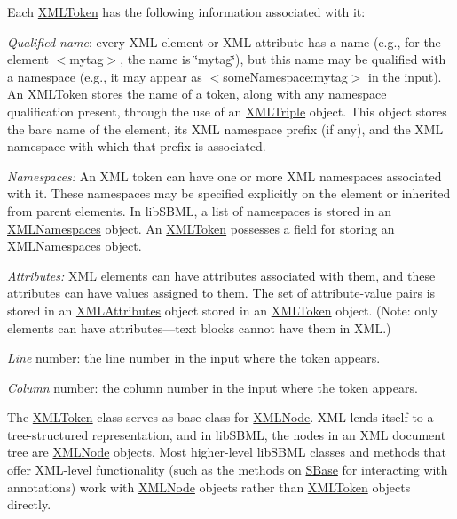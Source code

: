 Each \hyperlink{class_x_m_l_token}{X\+M\+L\+Token} has the following information associated with it\+: 
\begin{DoxyEnumerate}
\item {\itshape Qualified name}\+: every X\+ML element or X\+ML attribute has a name (e.\+g., for the element {\ttfamily $<$mytag$>$}, the name is {\ttfamily \char`\"{}mytag\char`\"{}}), but this name may be qualified with a namespace (e.\+g., it may appear as {\ttfamily $<$some\+Namespace\+:mytag$>$} in the input). An \hyperlink{class_x_m_l_token}{X\+M\+L\+Token} stores the name of a token, along with any namespace qualification present, through the use of an \hyperlink{class_x_m_l_triple}{X\+M\+L\+Triple} object. This object stores the bare name of the element, its X\+ML namespace prefix (if any), and the X\+ML namespace with which that prefix is associated. 
\item {\itshape Namespaces\+:} An X\+ML token can have one or more X\+ML namespaces associated with it. These namespaces may be specified explicitly on the element or inherited from parent elements. In lib\+S\+B\+ML, a list of namespaces is stored in an \hyperlink{class_x_m_l_namespaces}{X\+M\+L\+Namespaces} object. An \hyperlink{class_x_m_l_token}{X\+M\+L\+Token} possesses a field for storing an \hyperlink{class_x_m_l_namespaces}{X\+M\+L\+Namespaces} object. 
\item {\itshape Attributes\+:} X\+ML elements can have attributes associated with them, and these attributes can have values assigned to them. The set of attribute-\/value pairs is stored in an \hyperlink{class_x_m_l_attributes}{X\+M\+L\+Attributes} object stored in an \hyperlink{class_x_m_l_token}{X\+M\+L\+Token} object. (Note\+: only elements can have attributes---text blocks cannot have them in X\+ML.) 
\item {\itshape Line} number\+: the line number in the input where the token appears. 
\item {\itshape Column} number\+: the column number in the input where the token appears. 
\end{DoxyEnumerate}

The \hyperlink{class_x_m_l_token}{X\+M\+L\+Token} class serves as base class for \hyperlink{class_x_m_l_node}{X\+M\+L\+Node}. X\+ML lends itself to a tree-\/structured representation, and in lib\+S\+B\+ML, the nodes in an X\+ML document tree are \hyperlink{class_x_m_l_node}{X\+M\+L\+Node} objects. Most higher-\/level lib\+S\+B\+ML classes and methods that offer X\+M\+L-\/level functionality (such as the methods on \hyperlink{class_s_base}{S\+Base} for interacting with annotations) work with \hyperlink{class_x_m_l_node}{X\+M\+L\+Node} objects rather than \hyperlink{class_x_m_l_token}{X\+M\+L\+Token} objects directly.

